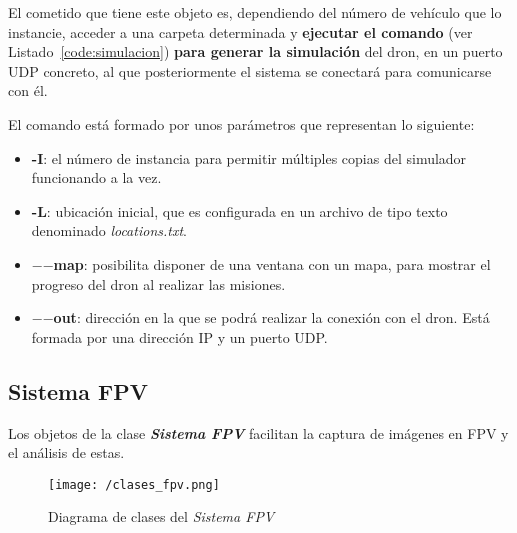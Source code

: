 El cometido que tiene este objeto es, dependiendo del número de vehículo que lo instancie, acceder a una carpeta determinada y \textbf{ejecutar el comando} (ver Listado~\ref{code:simulacion}) \textbf{para generar la simulación} del dron, en un puerto UDP concreto, al que posteriormente el sistema se conectará para comunicarse con él.


El comando está formado por unos parámetros que representan lo siguiente:
\begin{itemize}
\item \textbf{-I}: el número de instancia para permitir múltiples copias del simulador funcionando a la vez.
\item \textbf{-L}: ubicación inicial, que es configurada en un archivo de tipo texto denominado \textit{locations.txt}.
\item \textbf{$-$$-$map}: posibilita disponer de una ventana con un mapa, para mostrar el progreso del dron al realizar las misiones.
\item \textbf{$-$$-$out}: dirección en la que se podrá realizar la conexión con el dron. Está formada por una dirección IP y un puerto UDP.
\end{itemize}

\subsection{Sistema FPV}
\label{sec:sistemafpv}

Los objetos de la clase \textbf{\textit{Sistema FPV}} facilitan la captura de imágenes en \acs{FPV} y el análisis de estas.

\begin{figure}[!h]
\begin{center}
\texttt{[image: /clases\_fpv.png]}
\caption[Diagrama de clases del \textit{Sistema FPV}]{Diagrama de clases del \textit{Sistema FPV}}
\label{fig:diagclasesfpv}
\end{center}
\end{figure}

